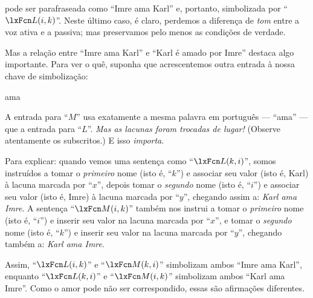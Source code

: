  pode ser parafraseada como \textquotedblleft Imre ama Karl\textquotedblright{} e, portanto, simbolizada por \textquotedblleft $\atom{L}{i,k}$\textquotedblright{}. Neste último caso, é claro, perdemos a diferença de \emph{tom} entre a voz ativa e a passiva; mas preservamos pelo menos as condições de verdade.




Mas a relação entre \textquotedblleft Imre ama Karl\textquotedblright{} e \textquotedblleft Karl é amado por Imre\textquotedblright{} destaca algo importante. Para ver o quê, suponha que acrescentemos outra entrada à nossa chave de simbolização:
\begin{ekey}
\item[\atom{M}{x,y}]  ama 
\end{ekey}
A entrada para \textquotedblleft $M$\textquotedblright{} usa exatamente a mesma palavra em português — \textquotedblleft ama\textquotedblright{} — que a entrada para \textquotedblleft $L$\textquotedblright{}. \emph{Mas as lacunas foram trocadas de lugar!} (Observe atentamente os subscritos.) E isso \emph{importa}.

Para explicar: quando vemos uma sentença como \textquotedblleft $\atom{L}{k,i}$\textquotedblright{}, somos instruídos a tomar o \emph{primeiro} nome (isto é, \textquotedblleft $k$\textquotedblright{}) e associar seu valor (isto é, Karl) à lacuna marcada por \textquotedblleft $x$\textquotedblright{}, depois tomar o \emph{segundo} nome (isto é, \textquotedblleft $i$\textquotedblright{}) e associar seu valor (isto é, Imre) à lacuna marcada por \textquotedblleft $y$\textquotedblright{}, chegando assim a: \emph{Karl ama Imre}. A sentença \textquotedblleft $\atom{M}{i,k}$\textquotedblright{} também nos instrui a tomar o \emph{primeiro} nome (isto é, \textquotedblleft $i$\textquotedblright{}) e inserir seu valor na lacuna marcada por \textquotedblleft $x$\textquotedblright{}, e tomar o \emph{segundo} nome (isto é, \textquotedblleft $k$\textquotedblright{}) e inserir seu valor na lacuna marcada por \textquotedblleft $y$\textquotedblright{}, chegando também a: \emph{Karl ama Imre}.










Assim, \textquotedblleft $\atom{L}{i,k}$\textquotedblright{} e \textquotedblleft $\atom{M}{k,i}$\textquotedblright{} simbolizam ambos \textquotedblleft Imre ama Karl\textquotedblright{}, enquanto \textquotedblleft $\atom{L}{k,i}$\textquotedblright{} e \textquotedblleft $\atom{M}{i,k}$\textquotedblright{} simbolizam ambos \textquotedblleft Karl ama Imre\textquotedblright{}. Como o amor pode não ser correspondido, essas são afirmações diferentes.

